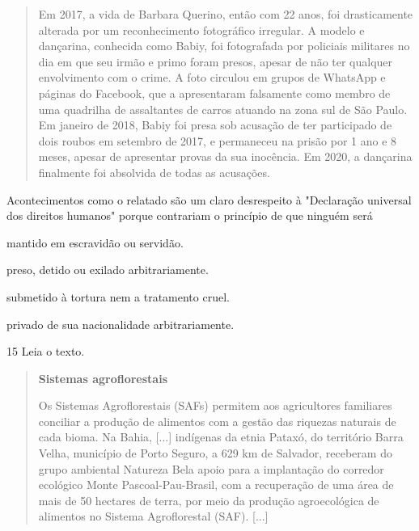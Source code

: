 \begin{escolha}
\begin{escolha}
\begin{escolha}
\begin{quote}
Em 2017, a vida de Barbara Querino, então com 22 anos, foi drasticamente alterada por um reconhecimento 
fotográfico irregular. A modelo e dançarina, conhecida como Babiy, foi fotografada por policiais militares 
no dia em que seu irmão e primo foram presos, apesar de não ter qualquer envolvimento com o crime. A foto 
circulou em grupos de WhatsApp e páginas do Facebook, que a apresentaram falsamente como membro de uma 
quadrilha de assaltantes de carros atuando na zona sul de São Paulo. Em janeiro de 2018, Babiy foi presa 
sob acusação de ter participado de dois roubos em setembro de 2017, e permaneceu na prisão por 1 ano e 8 
meses, apesar de apresentar provas da sua inocência. Em 2020, a dançarina finalmente foi absolvida de todas 
as acusações.

\end{quote}

Acontecimentos como o relatado são um claro desrespeito à "Declaração
universal dos direitos humanos" porque contrariam o princípio de que ninguém será

\begin{escolha}
\item  mantido em escravidão ou servidão.

\item  preso, detido ou exilado arbitrariamente.

\item  submetido à tortura nem a tratamento cruel.

\item  privado de sua nacionalidade arbitrariamente.
\end{escolha}


\num{15} Leia o texto.

\begin{quote}
\textbf{Sistemas agroflorestais}

Os Sistemas Agroflorestais (SAFs) permitem aos agricultores familiares conciliar a produção de alimentos com a gestão das riquezas naturais de cada bioma. Na Bahia, {[}...{]} indígenas da etnia Pataxó, do território Barra Velha, município de Porto Seguro, a 629 km de Salvador, receberam do grupo ambiental Natureza Bela apoio para a implantação do corredor ecológico Monte Pascoal-Pau-Brasil, com a recuperação de uma área de mais de 50 hectares de terra, por meio da produção agroecológica de alimentos no Sistema Agroflorestal (SAF). {[}...{]}


\end{quote}
\end{escolha}
\end{escolha}
\end{escolha}
